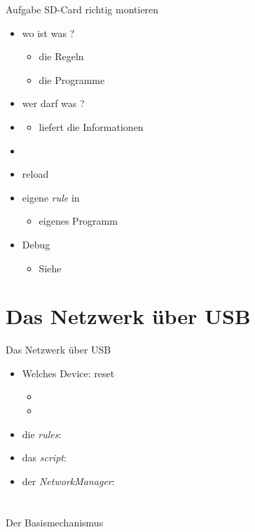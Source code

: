 \documentclass{beamer}
\begin{document}
\begin{frame}{Aufgabe }{SD-Card richtig montieren}
 \begin{itemize}
  \item wo ist was ?
   \begin{itemize}
    \item die Regeln
    \item die Programme
   \end{itemize}
   \item wer darf was ?
  \item {}
  \begin{itemize}
   \item liefert die Informationen
  \end{itemize}
  \item {}
  \item {} reload
  \item eigene {\em rule}  in 
  \begin{itemize}
   \item {} eigenes Programm
  \end{itemize}
  \item Debug
  \begin{itemize}
   \item Siehe 
  \end{itemize}
 \end{itemize}
\end{frame}

\section{Das Netzwerk über USB}
\begin{frame}{Das Netzwerk über USB}
 \begin{itemize}
  \item Welches Device: \targetS reset
  \begin{itemize}
   \item {}
   \item {}
  \end{itemize}
  \item die {\em rules}: 
  \item das {\em script}: 
  \item der {\em NetworkManager}: 
 \end{itemize}
\end{frame}

\section{\target}

\begin{frame}{Der Basismechanismus}

\end{frame}
\end{document}
